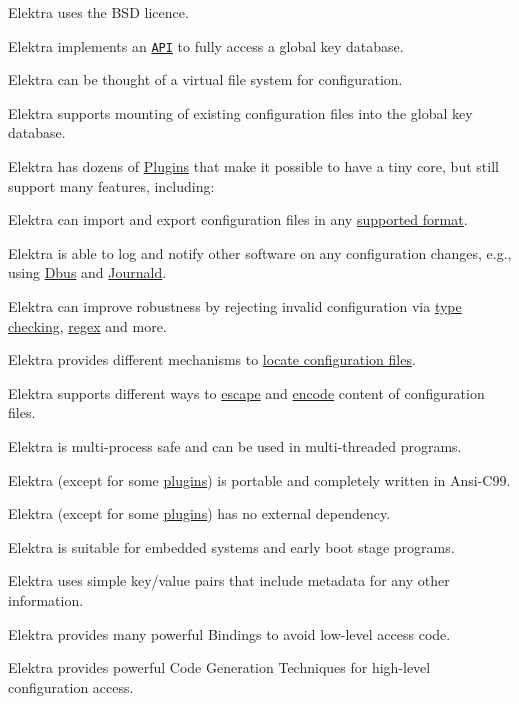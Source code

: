 \begin{DoxyItemize}
\item Elektra uses the B\+S\+D licence.
\item Elektra implements an \href{http://doc.libelektra.org/api/latest/html/}{\tt A\+P\+I} to fully access a global key database.
\item Elektra can be thought of a virtual file system for configuration.
\item Elektra supports mounting of existing configuration files into the global key database.
\item Elektra has dozens of \hyperlink{md_src_plugins_README_src_plugins_README_md}{Plugins} that make it possible to have a tiny core, but still support many features, including\+:
\begin{DoxyItemize}
\item Elektra can import and export configuration files in any \hyperlink{md_src_plugins_README_src_plugins_README_md}{supported format}.
\item Elektra is able to log and notify other software on any configuration changes, e.\+g., using \hyperlink{md_src_plugins_dbus_README_src_plugins_dbus_README_md}{Dbus} and \hyperlink{md_src_plugins_journald_README_src_plugins_journald_README_md}{Journald}.
\item Elektra can improve robustness by rejecting invalid configuration via \hyperlink{md_src_plugins_type_README_src_plugins_type_README_md}{type checking}, \hyperlink{md_src_plugins_validation_README_src_plugins_validation_README_md}{regex} and more.
\item Elektra provides different mechanisms to \hyperlink{md_src_plugins_resolver_README_src_plugins_resolver_README_md}{locate configuration files}.
\item Elektra supports different ways to \hyperlink{md_src_plugins_ccode_README_src_plugins_ccode_README_md}{escape} and \hyperlink{md_src_plugins_iconv_README_src_plugins_iconv_README_md}{encode} content of configuration files.
\end{DoxyItemize}
\item Elektra is multi-\/process safe and can be used in multi-\/threaded programs.
\item Elektra (except for some \hyperlink{md_src_plugins_README_src_plugins_README_md}{plugins}) is portable and completely written in Ansi-\/\+C99.
\item Elektra (except for some \hyperlink{md_src_plugins_README_src_plugins_README_md}{plugins}) has no external dependency.
\item Elektra is suitable for embedded systems and early boot stage programs.
\item Elektra uses simple key/value pairs that include metadata for any other information.
\item Elektra provides many powerful Bindings to avoid low-\/level access code.
\item Elektra provides powerful Code Generation Techniques for high-\/level configuration access.
\end{DoxyItemize}

